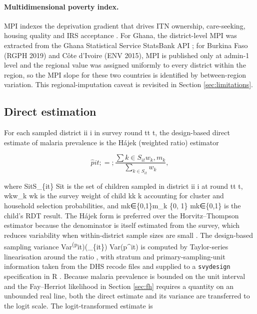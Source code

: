 \documentclass{article}
\begin{document}
\paragraph{Multidimensional poverty index.}

MPI indexes the deprivation gradient that drives ITN ownership,
care-seeking, housing quality and IRS acceptance
\citep{tusting2017housing, tusting2019mapping}. For Ghana, the
district-level MPI was extracted from the Ghana Statistical Service
StatsBank API \citep{florey2014}; for Burkina Faso (RGPH 2019) and Côte
d'Ivoire (ENV 2015), MPI is published only at admin-1 level and the
regional value was assigned uniformly to every district within the
region, so the MPI slope for these two countries is identified by
between-region variation. This regional-imputation caveat is revisited
in Section \ref{sec:limitations}.

\subsection{Direct estimation}\label{direct-estimation}

\label{sec:direct} For each sampled district ii i in survey round tt t,
the design-based direct estimate of malaria prevalence is the Hájek
(weighted ratio) estimator

\begin{equation}

\hat{p}{it} ;=; \frac{\sum{k \in S_{it}} w_k , m_k}{\sum_{k \in S_{it}} w_k},

\label{eq:hajek}

\end{equation}

where SitS\_\{it\} Sit\hspace{0pt} is the set of children sampled in
district ii i at round tt t, wkw\_k wk\hspace{0pt} is the survey weight
of child kk k accounting for cluster and household selection
probabilities, and mk∈\{0,1\}m\_k \in \{0, 1\} mk\hspace{0pt}∈\{0,1\} is
the child's RDT result. The Hájek form is preferred over the
Horvitz--Thompson estimator because the denominator is itself estimated
from the survey, which reduces variability when within-district sample
sizes are small \citep{cochran1977, lumley2010}. The design-based
sampling variance
Var\textsuperscript{(p}it)(\_\{it\})
Var(p\^{}\hspace{0pt}it\hspace{0pt}) is computed by Taylor-series
linearisation around the ratio \citep{binder1983}, with stratum and
primary-sampling-unit information taken from the DHS recode files and
supplied to a \texttt{svydesign} specification in R \citep{lumley2004}.
Because malaria prevalence is bounded on the unit interval and the
Fay--Herriot likelihood in Section \ref{sec:fh} requires a quantity on
an unbounded real line, both the direct estimate and its variance are
transferred to the logit scale. The logit-transformed estimate is
\end{document}
